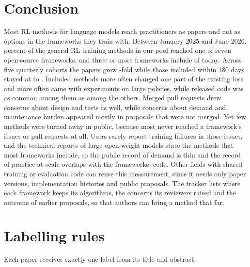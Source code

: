 \documentclass{article}
\begin{document}
\section{Conclusion}

Most RL methods for language models reach practitioners as papers and not as options in the frameworks they train with. Between January 2025 and June 2026, \RateMain{} percent of the general RL training methods in our pool reached one of seven open-source frameworks, and three or more frameworks include \NThree{} of \NGeneral{} today. Across five quarterly cohorts the papers grew \QSupplyRatio{}-fold while those included within 180 days stayed at \QIncMin{} to \QIncMax{}. Included methods more often changed one part of the existing loss and more often came with experiments on large policies, while released code was as common among them as among the others. Merged pull requests drew concerns about design and tests as well, while concerns about demand and maintenance burden appeared mostly in proposals that were not merged. Yet few methods were turned away in public, because most never reached a framework's issues or pull requests at all. Users rarely report training failures in those issues, and the technical reports of large open-weight models state the methods that most frameworks include, so the public record of demand is thin and the record of practice at scale overlaps with the frameworks' code. Other fields with shared training or evaluation code can reuse this measurement, since it needs only paper versions, implementation histories and public proposals. The tracker lists where each framework keeps its algorithms, the concerns its reviewers raised and the outcome of earlier proposals, so that authors can bring a method that far.




\appendix

\section{Labelling rules}
\label{app:rules}

Each paper receives exactly one label from its title and abstract.
\end{document}
